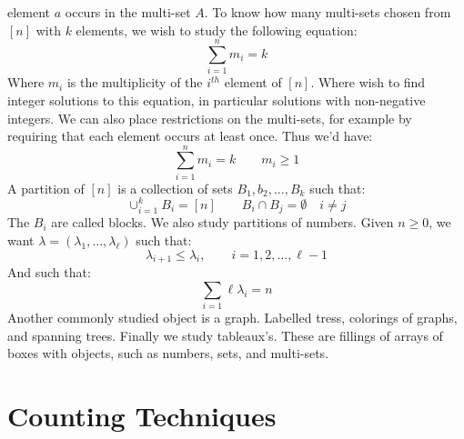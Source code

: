 \documentclass[crop=false,class=book,oneside]{standalone}                      %
\begin{document}
        element $a$ occurs in the multi-set $A$. To know how
        many multi-sets chosen from $[n]$ with $k$ elements,
        we wish to study the following equation:
        \begin{equation}
            \sum_{i=1}^{n}m_{i}=k
        \end{equation}
        Where $m_{i}$ is the multiplicity of the $i^{th}$
        element of $[n]$. Where wish to find integer solutions
        to this equation, in particular solutions with
        non-negative integers. We can also place restrictions
        on the multi-sets, for example by requiring that
        each element occurs at least once. Thus we'd have:
        \begin{equation}
            \sum_{i=1}^{n}m_{i}=k
            \quad\quad
            m_{i}\geq{1}
        \end{equation}
        A partition of $[n]$ is a collection of sets
        $B_{1},b_{2},\dots,B_{k}$ such that:
        \begin{equation}
            \cup_{i=1}^{k}B_{i}=[n]
            \quad\quad
            B_{i}\cap{B}_{j}=\emptyset
            \quad{i}\ne{j}
        \end{equation}
        The $B_{i}$ are called \textrm{blocks}. We also
        study partitions of numbers. Given $n\geq{0}$, we
        want $\lambda=(\lambda_{1},\dots,\lambda_{\ell})$ such
        that:
        \begin{equation}
            \lambda_{i+1}\leq\lambda_{i},
            \quad\quad
            i=1,2,\dots,\ell-1
        \end{equation}
        And such that:
        \begin{equation}
            \sum_{i=1}{\ell}\lambda_{i}=n
        \end{equation}
        Another commonly studied object is a graph. Labelled
        tress, colorings of graphs, and spanning trees. Finally
        we study tableaux's. These are fillings of arrays
        of boxes with objects, such as numbers, sets, and
        multi-sets.
    \section{Counting Techniques}
\end{document}
